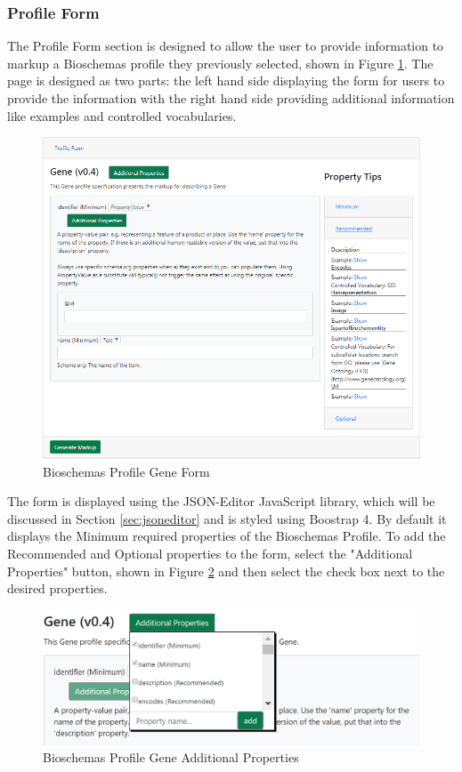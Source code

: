\newpage
\subsubsection*{Profile Form}
The Profile Form section is designed to allow the user to provide information to markup a Bioschemas profile they previously selected, shown in Figure \ref{fig:geneProfile}. The page is designed as two parts: the left hand side displaying the form for users to provide the information with the right hand side providing additional information like examples and controlled vocabularies. \newline

\begin{figure}[!h]
 \centering\includegraphics[scale=0.7]{images/system/geneForm.PNG}
   \caption{Bioschemas Profile Gene Form}
   \label{fig:geneProfile}
\end{figure}

\newpage
The form is displayed using the JSON-Editor JavaScript library, which will be discussed in Section \ref{sec:jsoneditor} and is styled using Boostrap 4. By default it displays the Minimum required properties of the Bioschemas Profile. To add the Recommended and Optional properties to the form, select the "Additional Properties" button, shown in Figure \ref{fig:additionalProperties} and then select the check box next to the desired properties.\newline

\begin{figure}[!h]
 \centering\includegraphics[scale=0.7]{images/system/geneAdditionalProperties.PNG}
   \caption{Bioschemas Profile Gene Additional Properties}
   \label{fig:additionalProperties}
\end{figure} 

